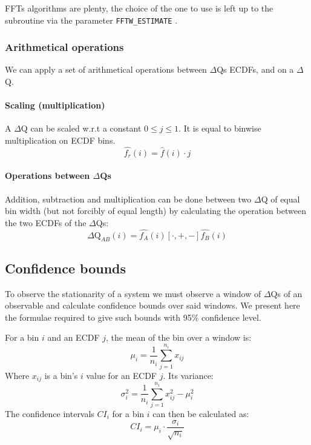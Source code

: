     FFTs algorithms are plenty, the choice of the one to use is left up to the subroutine via the parameter \texttt{FFTW\_ESTIMATE} \cite{fft-h}.

    \subsubsection{Arithmetical operations}
        We can apply a set of arithmetical operations between $\Delta$Qs ECDFs, and on a $\Delta$Q.
    \paragraph{Scaling (multiplication)} A $\Delta$Q can be scaled w.r.t a constant $0 \le j \le 1$. It is equal to binwise multiplication on ECDF bins.
    \begin{equation}
        \hat{f_r}(i) = \hat{f}(i) \cdot j
        \label{eq:mul_ecdf}
    \end{equation}

    \paragraph{Operations between $\Delta$Qs} 
        Addition, subtraction and multiplication can be done between two $\Delta$Q of equal bin width (but not forcibly of equal length) by calculating the operation between the two ECDFs of the $\Delta$Qs:
        \begin{equation}
            \Delta \text{Q}_{AB}(i) = \hat{f_A}(i) [\cdot, +, -] \hat{f_B}(i)
            \label{eq:op_dq}
        \end{equation}


    \subsection{Confidence bounds}
       To observe the stationarity of a system we must observe a window of $\Delta$Qs of an observable and calculate confidence bounds over said windows. We present here the formulae required to give such bounds with 95\% confidence level. 

        For a bin $i$ and an ECDF $j$, the mean of the bin over a window is:
            \begin{equation}
                \mu_i = \dfrac{1}{n_i} \sum_{j=1}^{n_i} x_{ij}
                \label{eq:mean_ecdf}
            \end{equation}
        Where $x_{ij}$ is a bin's $i$ value for an ECDF $j$.
        Its variance:
            \begin{equation}
                \sigma^2_i = \dfrac{1}{n_i} \sum_{j=1}^{n_i} x^2_{ij} - \mu^2_i
                \label{eq:var_ecdf}
            \end{equation}
        The confidence intervals $CI_i$ for a bin $i$ can then be calculated as:
        \begin{equation}
            CI_i = \mu_i \cdot \dfrac{\sigma_i}{\sqrt{n_i}}      
            \label{eq:ci_i}
        \end{equation}

